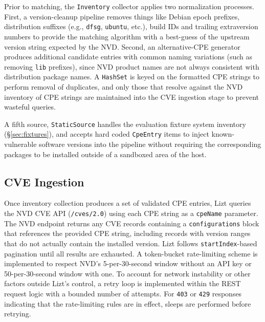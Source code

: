 \documentclass[conference]{IEEEtran}
\begin{document}
Prior to matching, the \texttt{Inventory} collector applies two normalization processes.
First, a version-cleanup pipeline removes things like Debian epoch prefixes, distribution suffixes (e.g., \texttt{dfsg}, \texttt{ubuntu}, etc.), build IDs and trailing extraversion numbers to provide the matching algorithm with a best-guess of the upstream version string expected by the NVD.
Second, an alternative-CPE generator produces additional candidate entries with common naming variations (such as removing \texttt{lib} prefixes), since NVD product names are not always consistent with distribution package names.
A \texttt{HashSet} is keyed on the formatted CPE strings to perform removal of duplicates, and only those that resolve against the NVD inventory of CPE strings are maintained into the CVE ingestion stage to prevent wasteful queries.

A fifth source, \texttt{StaticSource} handles the evaluation fixture system inventory (\S\ref{sec:fixtures}), and accepts hard coded \texttt{CpeEntry} items to inject known-vulnerable software versions into the pipeline without requiring the corresponding packages to be installed outside of a sandboxed area of the host.

\subsection{CVE Ingestion}
Once inventory collection produces a set of validated CPE entries, Lizt queries the NVD CVE API (\texttt{/cves/2.0}) using each CPE string as a \texttt{cpeName} parameter.
The NVD endpoint returns any CVE records containing a \texttt{configurations} block that references the provided CPE string, including records with version ranges that do not actually contain the installed version.
Lizt follows \texttt{startIndex}-based pagination until all results are exhausted.
A token-bucket rate-limiting scheme is implemented to respect NVD's 5-per-30-second window without an API key or 50-per-30-second window with one.
To account for network instability or other factors outside Lizt's control, a retry loop is implemented within the REST request logic with a bounded number of attempts.
For \texttt{403} or \texttt{429} responses indicating that the rate-limiting rules are in effect, sleeps are performed before retrying.
\end{document}
